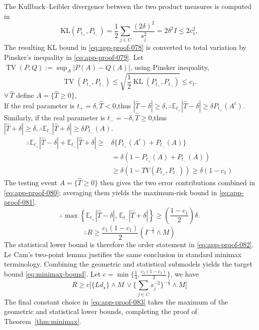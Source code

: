 \documentclass[11pt]{article}
\numberwithin{equation}{section}
\newcommand{\1}{\mathbf 1}
\begin{document}
The Kullback--Leibler divergence between the two product measures is
computed in
\begin{equation}
\label{eq:app-proof-078}
\mathrm{KL}(P_{t_+},P_{t_-})
  =\frac12\sum_{j\in C}\frac{(2\delta)^2}{s_j^2}
  =2\delta^2 I\leq 2c_1^2,
\end{equation}
The resulting KL bound in \eqref{eq:app-proof-078} is converted to total
variation by Pinsker's inequality in \eqref{eq:app-proof-079}.  Let
\(\operatorname{TV}(P,Q)
:=
\sup_A|P(A)-Q(A)|\), using Pinsker inequality,
\begin{equation}
\label{eq:app-proof-079}
\operatorname{TV}(P_{t_+},P_{t_-})
\le
\sqrt{
\frac12\operatorname{KL}(P_{t_+},P_{t_-})
}
\le c_1.
\end{equation}
\(
\forall\, \widehat T
\) define \(A=\{\widehat T\ge0\}\),\\
If the real parameter is \(t_+=\delta,\widehat T<0\),thus \(|\widehat T-\delta|\ge\delta,\therefore \mathbb E_{t_+}|\widehat T-\delta|
\ge
\delta P_{t_+}(A^c).
\) Similarly, if the real parameter is \(t_-=-\delta,\widehat T\ge0\),thus \(|\widehat T+\delta|\ge\delta,\therefore \mathbb E_{t_-}|\widehat T+\delta|
\ge
\delta P_{t_-}(A).
\) 
\begin{equation}
\label{eq:app-proof-080}
\begin{aligned}
\therefore
\mathbb E_{t_+}|\widehat T-\delta|
+
\mathbb E_{t_-}|\widehat T+\delta|
\ge{}&
\delta\{P_{t_+}(A^c)+P_{t_-}(A)\}\\
&=\delta(1-P_{t_+}(A)+P_{t_-}(A))\\
&\ge \delta(1-TV(P_{t_+},P_{t_-}))\ge\delta(1-c_1)
\end{aligned}
\end{equation}
The testing event \(A=\{\widehat T\ge0\}\) then gives the two error
contributions combined in \eqref{eq:app-proof-080}; averaging them yields
the maximum-risk bound in \eqref{eq:app-proof-081}.
\begin{equation}
\label{eq:app-proof-081}
\therefore \max\left\{
\mathbb E_{t_+}|\widehat T-\delta|,
\,
\mathbb E_{t_-}|\widehat T+\delta|
\right\}
\ge
(\frac{1-c_1}2)\delta.
\end{equation}
\begin{equation}
\label{eq:app-proof-082}
\therefore R\ge \frac{c_1(1-c_1)}2 (I^{-\frac12}\wedge M)
\end{equation}
The statistical lower bound is therefore the order statement in
\eqref{eq:app-proof-082}.  Le Cam's two-point lemma justifies the same
conclusion in standard minimax terminology.  Combining the geometric and
statistical submodels yields the target bound \eqref{eq:minimax-bound}.
Let \(c=\min\{\frac14,\frac{c_1(1-c_1)}2\}\), we have 
\begin{equation}
\label{eq:app-proof-083}
R\ge c\Bigg[\{Ld_\star\}\wedge M \,\vee \{\sum_{j\in C}s_j^{-2}\}^{-\frac12}\wedge M \Bigg]
\end{equation}
The final constant choice in \eqref{eq:app-proof-083} takes the maximum of
the geometric and statistical lower bounds, completing the proof of
Theorem~\ref{thm:minimax}.
\end{document}
